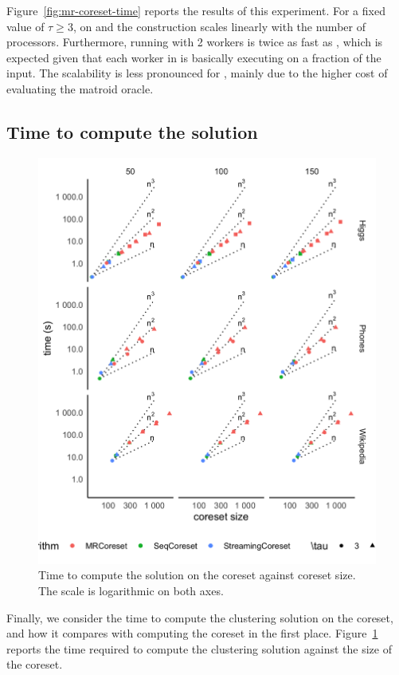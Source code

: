Figure~\ref{fig:mr-coreset-time} reports the results of this experiment. 
For a fixed value of $\tau \ge 3$, on \higgs and \phones the \mapr construction scales linearly with the 
number of processors. Furthermore, running \mapr with 2 workers is twice as fast as \seq, which is expected
given that each worker in \mapr is basically executing \seq on a fraction of the input.
The scalability is less pronounced for \wiki, mainly due to the higher cost of evaluating the matroid oracle.

\subsection{Time to compute the solution}

\begin{figure}
    \includegraphics[width=\columnwidth]{solution-time.png}
    \caption{
        \label{fig:solution-time}
        Time to compute the solution on the coreset against coreset size.
        The scale is logarithmic on both axes.
    }
\end{figure}

Finally, we consider the time to compute the clustering solution on the coreset, and 
how it compares with computing the coreset in the first place.
Figure~\ref{fig:solution-time} reports the time required to compute the clustering
solution against the size of the coreset.



